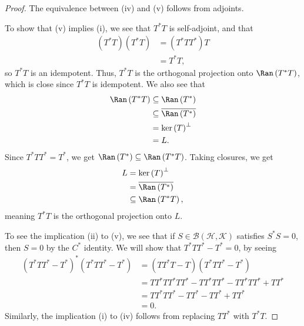 \documentclass[10pt]{mypackage}
\begin{document}
\begin{proof}
  The equivalence between (iv) and (v) follows from adjoints.\newline

  To show that (v) implies (i), we see that $T^{\ast}T$ is self-adjoint, and that
  \begin{align*}
    \left(T^{\ast}T\right)\left(T^{\ast}T\right) &= \left(T^{\ast}TT^{\ast}\right)T\\
                                                 &= T^{\ast}T,
  \end{align*}
  so $T^{\ast}T$ is an idempotent. Thus, $T^{\ast}T$ is the orthogonal projection onto $\Ran\left(T^{\ast}T\right)$, which is close since $T^{\ast}T$ is idempotent. We also see that
  \begin{align*}
    \Ran\left(T^{\ast}T\right)&\subseteq \Ran\left(T^{\ast}\right)\\
                              &\subseteq \overline{\Ran\left(T^{\ast}\right)}\\
                              &= \ker\left(T\right)^{\perp}\\
                              &= L.
  \end{align*}
  Since $T^{\ast}TT^{\ast} = T^{\ast}$, we get $\Ran\left(T^{\ast}\right)\subseteq \Ran\left(T^{\ast}T\right)$. Taking closures, we get
  \begin{align*}
    L &= \ker\left(T\right)^{\perp}\\
      &= \overline{\Ran\left(T^{\ast}\right)}\\
      &\subseteq \Ran\left(T^{\ast}T\right),
  \end{align*}
  meaning $T^{\ast}T$ is the orthogonal projection onto $L$.\newline

  To see the implication (ii) to (v), we see that if $S\in \mathcal{B}\left(\mathcal{H},\mathcal{K}\right)$ satisfies $S^{\ast}S = 0$, then $S = 0$ by the $C^{\ast}$ identity. We will show that $T^{\ast}TT^{\ast} - T^{\ast} = 0$, by seeing
  \begin{align*}
    \left(T^{\ast}TT^{\ast} - T^{\ast}\right)^{\ast}\left(T^{\ast}TT^{\ast} - T^{\ast}\right) &= \left(TT^{\ast}T - T\right)\left(T^{\ast}TT^{\ast} - T^{\ast}\right)\\
                                                                                              &= TT^{\ast}TT^{\ast}TT^{\ast} - TT^{\ast}TT^{\ast} - TT^{\ast}TT^{\ast} + TT^{\ast}\\
                                                                                              &= TT^{\ast}TT^{\ast} - TT^{\ast} - TT^{\ast} + TT^{\ast}\\
                                                                                              &= 0.
  \end{align*}
  Similarly, the implication (i) to (iv) follows from replacing $TT^{\ast}$ with $T^{\ast}T$.\newline


\end{proof}
\end{document}
